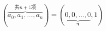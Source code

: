 \documentclass[nofonts]{ctexbook}
\begin{document}
\[
	(\overbrace{a_0, a_1, \dots, a_n}^{共 n+1 项}) =
	(\underbrace{0, 0, \dots, 0}_n, 1)
\]
\end{document}
